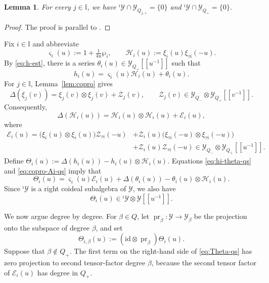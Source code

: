 \documentclass[11pt,reqno]{amsart}
\numberwithin{equation}{section}
\newtheorem{lem}[thm]{Lemma}
\theoremstyle{definition}
\theoremstyle{remark}
\newcommand{\mc}{\mathcal}
\newcommand{\I}{{\mathbb I}}
\newcommand{\Y}{{\mathscr{Y}}}
\newcommand{\Yi}{{^\imath\mathscr{Y}}}
\begin{document}
\begin{lem}\label{lem:cap=0}
For every $j\in\I$, we have $\Yi\cap\Y_{Q_{j,+}}=\{0\}$ and $
\Yi\cap\Y_{Q_+}=\{0\}$.
\end{lem}

\begin{proof}
The proof is parallel to 
\cite[Lemma~5.4]{Lu26min}. 



\end{proof}

Fix $i\in\I$ and abbreviate
\[\varsigma_i(u):=1+\tfrac{1}{4u}\wp_i,
\qquad
\mathcal H_i(u):=\xi_i(u)\xi_{\tau i}(-u).
\]
By \eqref{eq:h-est}, there is a series
$\theta_i(u)\in\Y_{Q_+}[\![u^{-1}]\!]$ such that
\begin{equation}\label{eq:hi-theta-qs}
h_i(u)=\varsigma_i(u)\mathcal H_i(u)+\theta_i(u).
\end{equation}
For $j\in\I$, Lemma~\ref{lem:copro} gives
\[
\Delta(\xi_j(v))
=\xi_j(v)\otimes\xi_j(v)+\mc Z_j(v),
\qquad
\mc Z_j(v)\in
\Y_{Q_-}\otimes\Y_{Q_+}[\![v^{-1}]\!].
\]
Consequently,
\begin{equation}\label{eq:copro-Ai-qs}
\Delta(\mc H_i(u))=\mc H_i(u)\otimes \mc H_i(u)+\mc E_i(u),
\end{equation}
where
\begin{align*}
\mc E_i(u)=
\bigl(\xi_i(u)\otimes\xi_i(u)\bigr)\mc Z_{\tau i}(-u)
&+\mc Z_i(u)\bigl(\xi_{\tau i}(-u)\otimes\xi_{\tau i}(-u)\bigr)\\
&+\mc Z_i(u)\mc Z_{\tau i}(-u)
\in\Y_{Q_-}\otimes\Y_{Q_+}[\![u^{-1}]\!].
\end{align*}
Define $\Theta_i(u):=
\Delta(h_i(u))-h_i(u)\otimes \mc H_i(u)$.
Equations \eqref{eq:hi-theta-qs} and \eqref{eq:copro-Ai-qs}
imply that
\begin{equation}\label{eq:Theta-qs}
\Theta_i(u)
=\varsigma_i(u)\mc E_i(u)
+\Delta(\theta_i(u))-\theta_i(u)\otimes \mc H_i(u).
\end{equation}
Since $\Yi$ is a right coideal subalgebra of $\Y$, we also have
\begin{equation}\label{eq:Theta-coideal-qs}
\Theta_i(u)\in\Yi\otimes\Y[\![u^{-1}]\!].
\end{equation}

We now argue degree by degree. For $\beta\in Q$, let
$\operatorname{pr}_\beta:\Y\to\Y_\beta$ be the projection onto the subspace of 
degree $\beta$, and set
\[
\Theta_{i,\beta}(u)
:=(\mathrm{id}\otimes\operatorname{pr}_\beta)\Theta_i(u).
\]
Suppose that $\beta\notin Q_+$. The first term on the right-hand side
of \eqref{eq:Theta-qs} has zero projection to second tensor-factor
degree $\beta$, because the second tensor factor of $\mc E_i(u)$ has
degree in $Q_+$.
\end{document}
